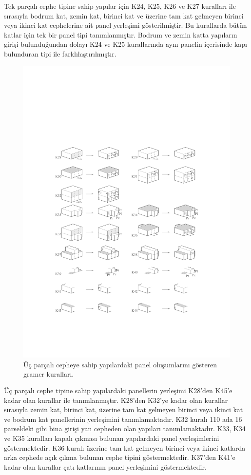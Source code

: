 \documentclass[12pt,turkish,a4paperpaper,]{report}
\begin{document}
Tek parçalı cephe tipine sahip yapılar için K24, K25, K26 ve K27
kuralları ile sırasıyla bodrum kat, zemin kat, birinci kat ve üzerine
tam kat gelmeyen birinci veya ikinci kat cephelerine ait panel yerleşimi
gösterilmiştir. Bu kurallarda bütün katlar için tek bir panel tipi
tanımlanmıştır. Bodrum ve zemin katta yapıların girişi bulunduğundan
dolayı K24 ve K25 kurallarında aynı panelin içerisinde kapı bulunduran
tipi ile farklılaştırılmıştır.

\begin{figure}
\centering
\includegraphics[width=1\textwidth,height=\textheight]{source/figures/K28-K44.pdf}
\caption{Üç parçalı cepheye sahip yapılardaki panel oluşumlarını
gösteren gramer kuralları. \label{K28K44}}
\end{figure}

Üç parçalı cephe tipine sahip yapılardaki panellerin yerleşimi K28'den
K45'e kadar olan kurallar ile tanımlanmıştır. K28'den K32'ye kadar olan
kurallar sırasıyla zemin kat, birinci kat, üzerine tam kat gelmeyen
birinci veya ikinci kat ve bodrum kat panellerinin yerleşimini
tanımlamaktadır. K32 kuralı 110 ada 16 parseldeki gibi bina girişi yan
cepheden olan yapıları tanımlamaktadır. K33, K34 ve K35 kuralları kapalı
çıkması bulunan yapılardaki panel yerleşimlerini göstermektedir. K36
kuralı üzerine tam kat gelmeyen birinci veya ikinci katlarda arka
cephede açık çıkma bulunan cephe tipini göstermektedir. K37'den K41'e
kadar olan kurallar çatı katlarının panel yerleşimini göstermektedir.
\end{document}
